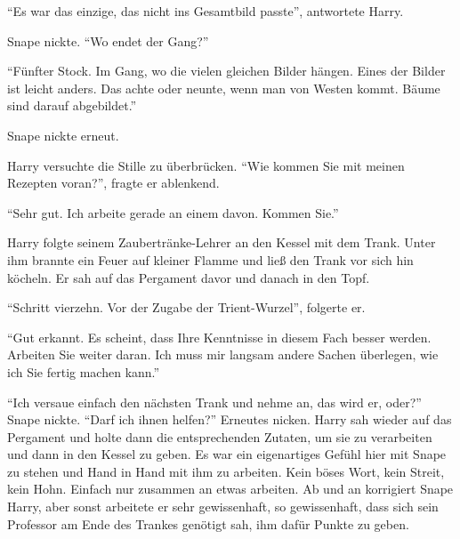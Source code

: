 \enquote{Es war das einzige, das nicht ins Gesamtbild passte}, antwortete Harry.

Snape nickte. \enquote{Wo endet der Gang?}

\enquote{Fünfter Stock. Im Gang, wo die vielen gleichen Bilder hängen. Eines der Bilder ist leicht anders. Das achte oder neunte, wenn man von Westen kommt. Bäume sind darauf abgebildet.}

Snape nickte erneut.

Harry versuchte die Stille zu überbrücken. \enquote{Wie kommen Sie mit meinen Rezepten voran?}, fragte er ablenkend.

\enquote{Sehr gut. Ich arbeite gerade an einem davon. Kommen Sie.}

Harry folgte seinem Zaubertränke-Lehrer an den Kessel mit dem Trank. Unter ihm brannte ein Feuer auf kleiner Flamme und ließ den Trank vor sich hin köcheln. Er sah auf das Pergament davor und danach in den Topf.

\enquote{Schritt vierzehn. Vor der Zugabe der Trient-Wurzel}, folgerte er.

\enquote{Gut erkannt. Es scheint, dass Ihre Kenntnisse in diesem Fach besser werden. Arbeiten Sie weiter daran. Ich muss mir langsam andere Sachen überlegen, wie ich Sie fertig machen kann.}

\enquote{Ich versaue einfach den nächsten Trank und nehme an, das wird er, oder?} Snape nickte. \enquote{Darf ich ihnen helfen?} Erneutes nicken. Harry sah wieder auf das Pergament und holte dann die entsprechenden Zutaten, um sie zu verarbeiten und dann in den Kessel zu geben. Es war ein eigenartiges Gefühl hier mit Snape zu stehen und Hand in Hand mit ihm zu arbeiten. Kein böses Wort, kein Streit, kein Hohn. Einfach nur zusammen an etwas arbeiten. Ab und an korrigiert Snape Harry, aber sonst arbeitete er sehr gewissenhaft, so gewissenhaft, dass sich sein Professor am Ende des Trankes genötigt sah, ihm dafür Punkte zu geben.

\trenn

